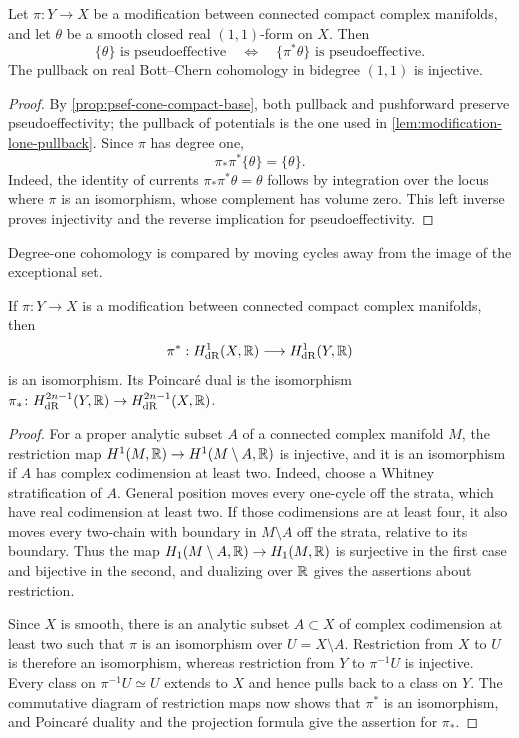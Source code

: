 \begin{lemma}\label{lem:lee-gauduchon-modification}
Let $\pi\colon Y\to X$ be a modification between connected compact complex manifolds, and let $\theta$ be a smooth closed real $(1,1)$-form on $X$. Then
\[
 \{\theta\}\text{ is pseudoeffective}
 \quad\Longleftrightarrow\quad
 \{\pi^*\theta\}\text{ is pseudoeffective}.
\]
The pullback on real Bott--Chern cohomology in bidegree $(1,1)$ is injective.
\end{lemma}
\begin{proof}
By \cref{prop:psef-cone-compact-base}, both pullback and pushforward preserve pseudoeffectivity; the pullback of potentials is the one used in \cref{lem:modification-lone-pullback}. Since $\pi$ has degree one,
\[
 \pi_*\pi^*\{\theta\}=\{\theta\}.
\]
Indeed, the identity of currents $\pi_*\pi^*\theta=\theta$ follows by integration over the locus where $\pi$ is an isomorphism, whose complement has volume zero. This left inverse proves injectivity and the reverse implication for pseudoeffectivity.
\end{proof}

Degree-one cohomology is compared by moving cycles away from the image of the exceptional set.

\begin{lemma}\label{lem:lee-gauduchon-blowup-cohomology}
If $\pi\colon Y\to X$ is a modification between connected compact complex manifolds, then
\[
 \pi^*:H^1_{\mathrm{dR}}(X,\mathbb R)\longrightarrow
                    H^1_{\mathrm{dR}}(Y,\mathbb R)
\]
is an isomorphism. Its Poincar\'e dual is the isomorphism
$\pi_*\colon H^{2n-1}_{\mathrm{dR}}(Y,\mathbb R)\to H^{2n-1}_{\mathrm{dR}}(X,\mathbb R)$.
\end{lemma}
\begin{proof}
For a proper analytic subset $A$ of a connected complex manifold $M$, the restriction map $H^1(M,\mathbb R)\to H^1(M\setminus A,\mathbb R)$ is injective, and it is an isomorphism if $A$ has complex codimension at least two. Indeed, choose a Whitney stratification of $A$. General position moves every one-cycle off the strata, which have real codimension at least two. If those codimensions are at least four, it also moves every two-chain with boundary in $M\setminus A$ off the strata, relative to its boundary. Thus the map $H_1(M\setminus A,\mathbb R)\to H_1(M,\mathbb R)$ is surjective in the first case and bijective in the second, and dualizing over $\mathbb R$ gives the assertions about restriction.

Since $X$ is smooth, there is an analytic subset $A\subset X$ of complex codimension at least two such that $\pi$ is an isomorphism over $U=X\setminus A$. Restriction from $X$ to $U$ is therefore an isomorphism, whereas restriction from $Y$ to $\pi^{-1}U$ is injective. Every class on $\pi^{-1}U\simeq U$ extends to $X$ and hence pulls back to a class on $Y$. The commutative diagram of restriction maps now shows that $\pi^*$ is an isomorphism, and Poincar\'e duality and the projection formula give the assertion for $\pi_*$.
\end{proof}

